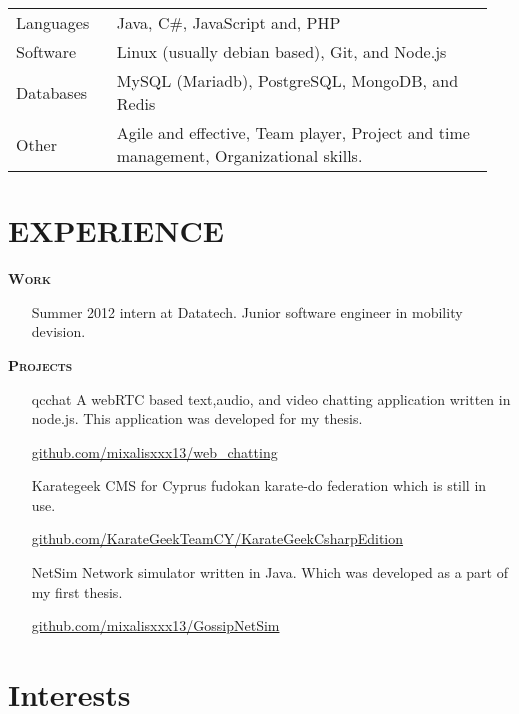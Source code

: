 \documentclass[margin, 10pt]{res} %
\begin{document}
\begin{resume}
\begin{tabular}{p{0.2\linewidth} p{0.75\linewidth}}
Languages & Java, C\#, JavaScript and, PHP						\\
Software & Linux (usually debian based), Git, and Node.js 		\\
Databases & MySQL (Mariadb), PostgreSQL, MongoDB, and Redis 	\\
Other & Agile and effective, Team player, Project and time management, Organizational skills.

\end{tabular} 

 
 
\section{EXPERIENCE} 

\textsc{ \textbf{Work}}

\begin{itemize}
\item[Summer 2012 intern] at Datatech. Junior software engineer in mobility devision. 
\end{itemize}

\textsc{ \textbf{Projects}}

\begin{itemize}

\item[qcchat] A webRTC based text,audio, and video chatting application written in node.js.
This application was developed for my thesis.

\href{https://github.com/mixalisxxx13/web_chatting}{github.com/mixalisxxx13/web\_chatting} \\



\item[Karategeek] CMS for Cyprus fudokan karate-do federation which is still in use. 

\href{https://github.com/KarateGeekTeamCY/KarateGeekCsharpEdition/tree/baseV4.5.1}{github.com/KarateGeekTeamCY/KarateGeekCsharpEdition} \\



\item[NetSim] Network simulator written in Java. 
Which was developed as a part of my first thesis.

\href{https://github.com/mixalisxxx13/GossipNetSim}{github.com/mixalisxxx13/GossipNetSim} 

\end{itemize}


\section{Interests}


\end{resume}
\end{document}
